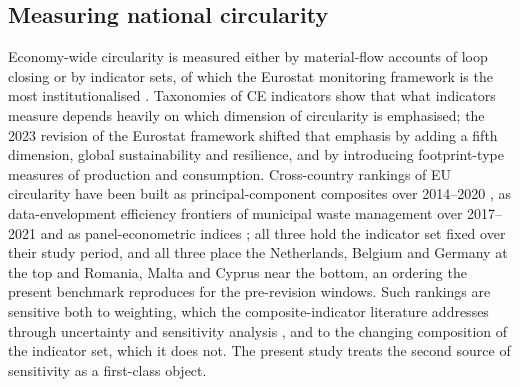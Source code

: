 \documentclass[a4paper,fleqn]{cas-sc}
\begin{document}
\subsection{Measuring national circularity}
Economy-wide circularity is measured either by material-flow accounts of loop closing \citep{haas2015,mayer2019} or by indicator sets, of which the Eurostat monitoring framework is the most institutionalised \citep{ec2018framework,ec2023framework}. Taxonomies of CE indicators \citep{saidani2019,moraga2019} show that what indicators measure depends heavily on which dimension of circularity is emphasised; the 2023 revision of the Eurostat framework shifted that emphasis by adding a fifth dimension, global sustainability and resilience, and by introducing footprint-type measures of production and consumption. Cross-country rankings of EU circularity have been built as principal-component composites over 2014--2020 \citep{martinezmoreno2023}, as data-envelopment efficiency frontiers of municipal waste management over 2017--2021 \citep{dadamo2024} and as panel-econometric indices \citep{kostakis2022}; all three hold the indicator set fixed over their study period, and all three place the Netherlands, Belgium and Germany at the top and Romania, Malta and Cyprus near the bottom, an ordering the present benchmark reproduces for the pre-revision windows. Such rankings are sensitive both to weighting, which the composite-indicator literature addresses through uncertainty and sensitivity analysis \citep{oecd2008handbook,saisana2005}, and to the changing composition of the indicator set, which it does not. The present study treats the second source of sensitivity as a first-class object.
\end{document}

